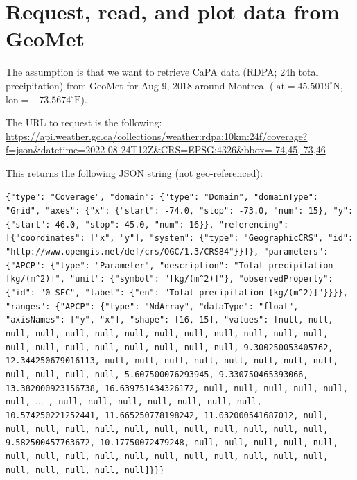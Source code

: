 \documentclass[10pt,a4paper,titlepage,parskip]{scrartcl}
\begin{document}
\section{Request, read, and plot data from GeoMet}

The assumption is that we want to retrieve CaPA data (RDPA; 24h total precipitation) from GeoMet for Aug 9, 2018 around Montreal ($\mathrm{lat} = 45.5019^{\circ}\mathrm{N}$, $\mathrm{lon}=-73.5674^{\circ}\mathrm{E}$). 

The URL to request is the following:
\url{https://api.weather.gc.ca/collections/weather:rdpa:10km:24f/coverage?f=json&datetime=2022-08-24T12Z&CRS=EPSG:4326&bbox=-74,45,-73,46}

This returns the following JSON string (not geo-referenced):
\begin{framed}	
		\texttt{\{"type": "Coverage", "domain": \{"type": "Domain", "domainType": "Grid", "axes": \{"x": \{"start": -74.0, "stop": -73.0, "num": 15\}, "y": \{"start": 46.0, "stop": 45.0, "num": 16\}\}, "referencing": [\{"coordinates": ["x", "y"], "system": \{"type": "GeographicCRS", "id": "http://www.opengis.net/def/crs/OGC/1.3/CRS84"\}\}]\}, "parameters": \{"APCP": \{"type": "Parameter", "description": "Total precipitation [kg/(m\^{}2)]", "unit": \{"symbol": "[kg/(m\^{}2)]"\}, "observedProperty": \{"id": "0-SFC", "label": \{"en": "Total precipitation [kg/(m\^{}2)]"\}\}\}\}, "ranges": \{"APCP": \{"type": "NdArray", "dataType": "float", "axisNames": ["y", "x"], "shape": [16, 15], "values": [null, null, null, null, null, null, null, null, null, null, null, null, null, null, null, null, null, null, null, null, null, 9.300250053405762, 12.344250679016113, null, null, null, null, null, null, null, null, null, null, null, null, 5.607500076293945, 9.330750465393066, 13.382000923156738, 16.639751434326172, null, null, null, null, null, null, $\ldots$ , null, null, null, null, null, null, null, 10.574250221252441, 11.665250778198242, 11.032000541687012, null, null, null, null, null, null, null, null, null, null, null, null, 9.582500457763672, 10.17750072479248, null, null, null, null, null, null, null, null, null, null, null, null, null, null, null, null, null, null, null, null, null]\}\}\}}\\
\end{framed}
\end{document}
